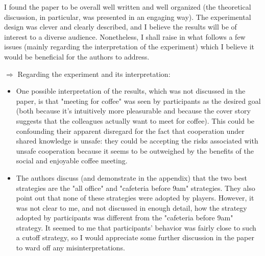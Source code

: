 \documentclass{article}
\begin{document}
I found the paper to be overall well written and well organized (the theoretical discussion, in particular, was presented in an engaging way). The experimental design was clever and clearly described, and I believe the results will be of interest to a diverse audience. Nonetheless, I shall raise in what follows a few issues (mainly regarding the interpretation of the experiment) which I believe it would be beneficial for the authors to address.

$\Rightarrow$ Regarding the experiment and its interpretation:
\begin{itemize}
  \item One possible interpretation of the results, which was not discussed in the paper, is that "meeting for coffee" was seen by participants as the desired goal (both because it's intuitively more pleasurable and because the cover story suggests that the colleagues actually want to meet for coffee). This could be confounding their apparent disregard for the fact that cooperation under shared knowledge is unsafe: they could be accepting the risks associated with unsafe cooperation because it seems to be outweighed by the benefits of the social and enjoyable coffee meeting.
 \item The authors discuss (and demonstrate in the appendix) that the two best strategies are the "all office" and "cafeteria before 9am" strategies. They also point out that none of these strategies were adopted by players. However, it was not clear to me, and not discussed in enough detail, how the strategy adopted by participants was different from the "cafeteria before 9am" strategy. It seemed to me that participants' behavior was fairly close to such a cutoff strategy, so I would appreciate some further discussion in the paper to ward off any misinterpretations.
\end{itemize}
\end{document}
